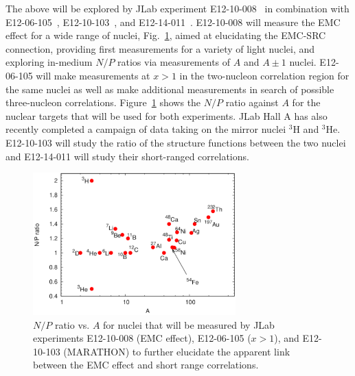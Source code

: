 The above will be explored by JLab experiment E12-10-008~\cite{12gev_emc} in combination
with E12-06-105~\cite{12gev_xgt1}, E12-10-103~\cite{mar}, and E12-14-011~\cite{tritsrc}. E12-10-008 will measure the EMC effect for a wide range of nuclei, Fig.~\ref{fig:np_ratios},
aimed at elucidating the EMC-SRC connection, providing first measurements for a variety of light nuclei,
and exploring in-medium $N/P$ ratios via measurements of $A$ and $A\pm1$ nuclei.  E12-06-105 will make
measurements at $x>1$ in the two-nucleon correlation region for the same nuclei as well as make additional
measurements in search of possible three-nucleon correlations. Figure~\ref{fig:np_ratios} shows the $N/P$
ratio against $A$ for the nuclear targets that will be used for both experiments.%
JLab Hall A has also recently completed a campaign of data taking on the mirror nuclei $^3$H and $^3$He. 
E12-10-103 will study the ratio of the structure functions between the two nuclei and 
E12-14-011 will study their short-ranged correlations.

\begin{figure}[tbp]
\includegraphics[width=\columnwidth,height=55mm]{plots/np_ratios_2019.pdf}
    \caption{$N/P$ ratio vs. $A$ for nuclei that will be measured by JLab experiments E12-10-008 (EMC effect), E12-06-105 ($x>1$), and E12-10-103 (MARATHON) to further elucidate the apparent link between the EMC effect and short range  correlations.}
\label{fig:np_ratios}
\end{figure}

